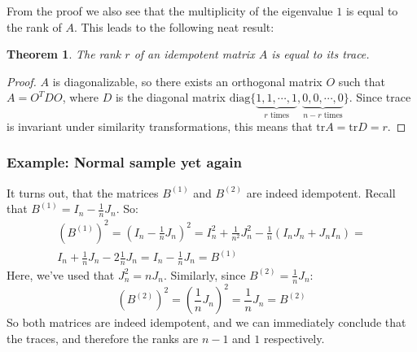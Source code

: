 \documentclass[12pt, a4paper]{article}
\newtheorem{theorem}{Theorem}
\begin{document}
From the proof we also see that the multiplicity of the eigenvalue $1$ is equal to the rank of $A$. This leads to the following neat result:

\begin{theorem}
The rank $r$ of an idempotent matrix $A$ is equal to its trace.
\end{theorem}
\begin{proof}
$A$ is diagonalizable, so there exists an orthogonal matrix $O$ such that $A=O^TDO$, where $D$ is the diagonal matrix $\textrm{diag}\{\underbrace{1, 1, \cdots, 1}_{r\textrm{ times}},\underbrace{0, 0,\cdots, 0}_{n-r\textrm{ times}}\}$.
Since trace is invariant under similarity transformations, this means that $\textrm{tr}A=\textrm{tr}D=r$.
\end{proof}

\subsubsection{Example: Normal sample yet again}
It turns out, that the matrices $B^{(1)}$ and $B^{(2)}$ are indeed idempotent. Recall that $B^{(1)}=I_n-\frac{1}{n}J_n$. So:
\begin{equation}
\begin{multlined}
(B^{(1)})^2=\left(I_n-\frac{1}{n}J_n\right)^2=I_n^2+\frac{1}{n^2}J_n^2-\frac{1}{n}(I_n J_n + J_n I_n)=\\
I_n+\frac{1}{n}J_n-2\frac{1}{n}J_n=I_n-\frac{1}{n}J_n=B^{(1)}
\end{multlined}
\end{equation}
Here, we've used that $J_n^2=nJ_n$. Similarly, since $B^{(2)}=\frac{1}{n}J_n$: 
\begin{equation}
(B^{(2)})^2=\left(\frac{1}{n}J_n\right)^2=\frac{1}{n}J_n=B^{(2)}
\end{equation}
So both matrices are indeed idempotent, and we can immediately conclude that the traces, and therefore the ranks are $n-1$ and $1$ respectively.
\end{document}
